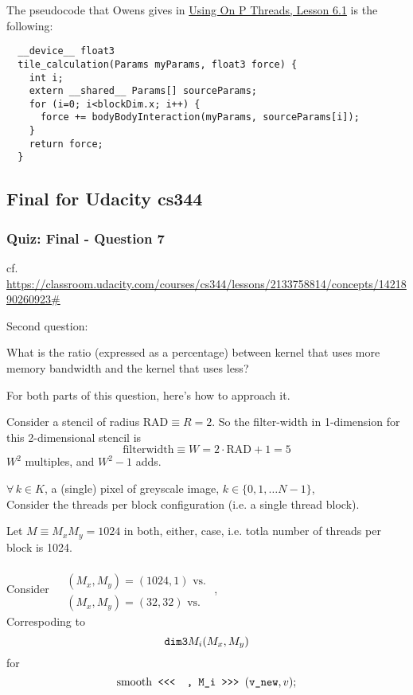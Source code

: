 \documentclass[10pt]{amsart}
\begin{document}
\begin{multicols*}{2}
The pseudocode that Owens gives in \href{https://classroom.udacity.com/courses/cs344/lessons/116611037/concepts/1168851160923}{Using On P Threads, Lesson 6.1} is the following:

\begin{lstlisting}
  __device__ float3
  tile_calculation(Params myParams, float3 force) {
    int i;
    extern __shared__ Params[] sourceParams;
    for (i=0; i<blockDim.x; i++) {
      force += bodyBodyInteraction(myParams, sourceParams[i]);
    }
    return force;
  }
  \end{lstlisting}


  
\subsection{Final for Udacity cs344}

\subsubsection{Quiz: Final - Question 7}

cf. \url{https://classroom.udacity.com/courses/cs344/lessons/2133758814/concepts/1421890260923#}

Second question:

What is the ratio (expressed as a percentage) between kernel that uses more memory bandwidth and the kernel that uses less?

For both parts of this question, here's how to approach it.

Consider a stencil of radius $\text{RAD} \equiv R = 2$.  So the filter-width in 1-dimension for this 2-dimensional stencil is
\[
\text{filterwidth} \equiv W  = 2 \cdot \text{RAD}  +1 = 5
\]
$W^2$ multiples, and $W^2-1$ adds.

$\forall \, k \in K$, a (single) pixel of greyscale image, $k\in \lbrace 0 , 1, \dots N-1 \rbrace$, \\

Consider the threads per block configuration (i.e. a single thread block).

Let $M \equiv M_x M_y = 1024$ in both, either, case, i.e. totla number of threads per block is 1024.

Consider $\begin{aligned} & \quad \\
  & (M_x,M_y) = (1024, 1) \text{ vs. } \\ 
  & (M_x,M_y) = (32, 32) \text{ vs. } \end{aligned}$,  \\
Correspoding to
\[
\verb|dim3| M_i(M_x,M_y)
\]
for
\[
\text{smooth} \verb| <<<  , M_i >>> |( \verb|v_new|, v) ;
\]


\end{multicols*}
\end{document}

